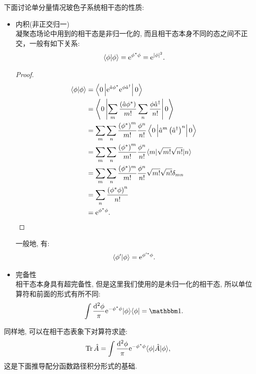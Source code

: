下面讨论单分量情况玻色子系统相干态的性质:
\begin{itemize}
\item 内积(非正交归一) \\
凝聚态场论中用到的相干态是非归一化的, 而且相干态本身不同的态之间不正交，一般有如下关系:
\begin{equation}
\langle\phi| \phi\rangle=\mathrm{e}^{\phi^{*} \phi}=\mathrm{e}^{|\phi|^{2}}.
\end{equation}
\begin{proof}
\begin{align}
\langle\phi | \phi\rangle &=\left\langle 0\left|\mathrm{e}^{\hat{a} \phi^{*}} \mathrm{e}^{\phi \hat{a}^{\dagger}}\right| 0\right\rangle\\
&=\left\langle 0\left|\sum_{m} \frac{\left(\hat{a} \phi^{*}\right)}{m !} \sum_{n} \frac{\phi \hat{a}^{\dagger}}{n !}\right| 0\right\rangle \nonumber\\
&=\sum_{m} \sum_{n} \frac{\left(\phi^{*}\right)^{m}}{m !} \frac{\phi^{n}}{n !}\left\langle 0\left|\hat{a}^{m}\left(\hat{a}^{\dagger}\right)^{n}\right| 0\right\rangle\nonumber\\
&=\sum_{m} \sum_{n} \frac{\left(\phi^{*}\right)^{m}}{m !} \frac{\phi^{n}}{n !}\langle m|\sqrt{m !} \sqrt{n !}| n\rangle \nonumber\\
&=\sum_{m} \sum_{n} \frac{(\phi^{*})^{m}}{m !} \frac{\phi^{n}}{n !} \sqrt{m !} \sqrt{n !} \delta_{m n}\nonumber\\
&=\sum_{n} \frac{\left(\phi^{*} \phi\right)^{n}}{n !} \nonumber\\
&=\mathrm{e}^{\phi^{*} \phi}.
\end{align}
\end{proof}
一般地, 有:
\begin{equation}
\langle\phi^\prime | \phi\rangle=\mathrm{e}^{\phi^{\prime *} \phi}.
\end{equation}

\item 完备性\\
相干态本身具有超完备性, 但是这里我们使用的是未归一化的相干态, 所以单位算符和前面的形式有所不同:
\begin{equation}
\int \frac{\mathrm{d}^{2} \phi}{\pi} \e^{-\phi^{*} \phi}|\phi\rangle\langle\phi|=\mathbbm 1 .
\end{equation}
\end{itemize}

同样地, 可以在相干态表象下对算符求迹:
\begin{equation}
\operatorname{Tr} \hat{A}=\int \frac{\mathrm{d}^{2} \phi}{\pi} \mathrm{e}^{-\phi^{*} \phi}\langle\phi|\hat{A}| \phi\rangle,
\end{equation}
这是下面推导配分函数路径积分形式的基础.

